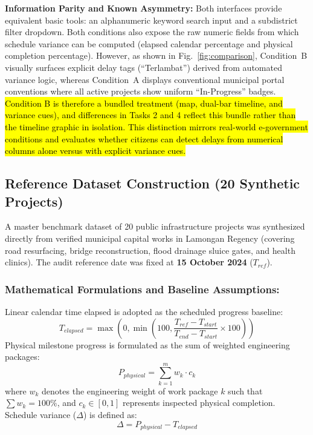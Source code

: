 \documentclass[runningheads]{llncs}
\begin{document}
\textbf{Information Parity and Known Asymmetry:} Both interfaces provide equivalent basic tools: an alphanumeric keyword search input and a subdistrict filter dropdown. Both conditions also expose the raw numeric fields from which schedule variance can be computed (elapsed calendar percentage and physical completion percentage). However, as shown in Fig.~\ref{fig:comparison}, Condition~B visually surfaces explicit delay tags (``Terlambat'') derived from automated variance logic, whereas Condition~A displays conventional municipal portal conventions where all active projects show uniform ``In-Progress'' badges. \hl{Condition B is therefore a bundled treatment (map, dual-bar timeline, and variance cues), and differences in Tasks 2 and 4 reflect this bundle rather than the timeline graphic in isolation. This distinction mirrors real-world e-government conditions and evaluates whether citizens can detect delays from numerical columns alone versus with explicit variance cues.}

\subsection{Reference Dataset Construction (20 Synthetic Projects)}
A master benchmark dataset of 20 public infrastructure projects was synthesized directly from verified municipal capital works in Lamongan Regency (covering road resurfacing, bridge reconstruction, flood drainage sluice gates, and health clinics). The audit reference date was fixed at \textbf{15 October 2024} ($T_{ref}$).

\subsubsection{Mathematical Formulations and Baseline Assumptions:}
Linear calendar time elapsed is adopted as the scheduled progress baseline:
\begin{equation}
T_{elapsed} = \max\left(0, \min\left(100, \frac{T_{ref} - T_{start}}{T_{end} - T_{start}} \times 100\right)\right)
\end{equation}
Physical milestone progress is formulated as the sum of weighted engineering packages:
\begin{equation}
P_{physical} = \sum_{k=1}^m w_k \cdot c_k
\end{equation}
where $w_k$ denotes the engineering weight of work package $k$ such that $\sum w_k = 100\%$, and $c_k \in [0, 1]$ represents inspected physical completion. Schedule variance ($\Delta$) is defined as:
\begin{equation}
\Delta = P_{physical} - T_{elapsed}
\end{equation}
\end{document}
